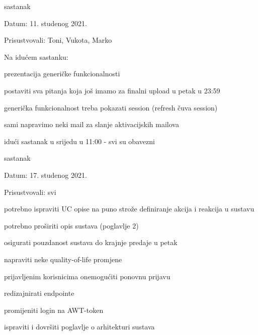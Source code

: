 \begin{packed_enum}
            \bigskip
            \noindent \item[\mylabel{itm61}{6.1.}]  sastanak
            \item[] \begin{packed_item}
                \item Datum: 11. studenog 2021.
                \item Prisustvovali: Toni, Vukota, Marko
                \item Na idućem sastanku: 
                \item[] \begin{packed_item}
                    \item prezentacija generičke funkcionalnosti
                    \item postaviti sva pitanja koja još imamo za finalni upload u petak u 23:59
                	\item generička funkcionalnost treba pokazati session (refresh čuva session)
                	\item sami napravimo neki mail za slanje aktivacijskih mailova
                	\item idući sastanak u srijedu u 11:00 - svi su obavezni
                \end{packed_item}
		    \end{packed_item}
	
	        \bigskip
	        \item sastanak
	        \item[] \begin{packed_item}
	           \item Datum: 17. studenog 2021.
	           \item Prisustvovali: svi
	           \item potrebno ispraviti UC opise na puno strože definiranje akcija i reakcija u sustavu
	            \item potrebno proširiti opis sustava (poglavlje 2)
            	\item osigurati pouzdanost sustava do krajnje predaje u petak
            	\item napraviti neke quality-of-life promjene
        		\item prijavljenim korisnicima onemogućiti ponovnu prijavu
        		\item redizajnirati endpointe
        		\item promijeniti login na AWT-token
            	\item ispraviti i dovršiti poglavlje o arhitekturi sustava
	        \end{packed_item}
	        

\end{packed_enum}
